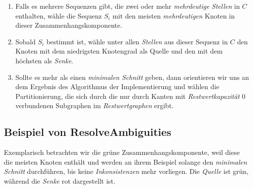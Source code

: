 \begin{enumerate}[topsep=0pt,itemsep=-1ex,partopsep=1ex,parsep=1ex]
	\item Falls es mehrere Sequenzen gibt, die zwei oder mehr \emph{mehrdeutige} \emph{Stellen} in $C$ enthalten, wähle die Sequenz $S_i$ mit den meisten \emph{mehrdeutigen} Knoten in dieser Zusammenhangskomponente.
	\item Sobald $S_i$ bestimmt ist, wähle unter allen \emph{Stellen} aus dieser Sequenz in $C$ den Knoten mit dem niedrigsten Knotengrad als Quelle und den mit dem höchsten als \emph{Senke}.
	\item Sollte es mehr als einen \emph{minimalen Schnitt} geben, dann orientieren wir uns an dem Ergebnis des Algorithmus der Implementierung und wählen die Partitionierung, die sich durch die nur durch Kanten mit \emph{Restwertkapazität} 0 verbundenen Subgraphen im \emph{Restwertgraphen} ergibt. 
\end{enumerate}

\subsection{Beispiel von \textrm{ResolveAmbiguities}}

Exemplarisch betrachten wir die grüne Zusammenhangskomponente, weil diese die meisten Knoten enthält und werden an ihrem Beispiel solange den \emph{minimalen Schnitt} durchführen, bis keine \emph{Inkonsistenzen} mehr vorliegen. Die \emph{Quelle} ist grün, während die \emph{Senke} rot dargestellt ist.

